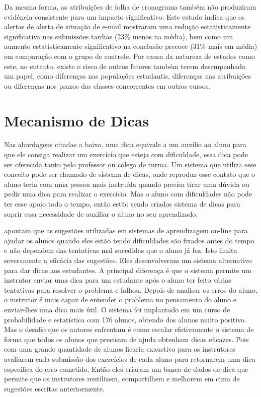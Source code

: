 Da mesma forma, as atribuições de folha de cronograma também não produziram evidência consistente para um impacto significativo. Este estudo indica que os alertas de alerta de situação de e-mail mostraram uma redução estatisticamente significativa nas submissões tardias (23\% menos na média), bem como um aumento estatisticamente significativo na conclusão precoce (31\% mais em média) em comparação com o grupo de controle. Por causa da natureza de estudos como este, no entanto, existe o risco de outros fatores também terem desempenhado um papel, como diferenças nas populações estudantis, diferenças nas atribuições ou diferenças nos prazos das classes concorrentes em outros cursos.

\section{Mecanismo de Dicas}

Nas abordagens citadas a baixo, uma dica equivale a um auxílio ao aluno para que ele consiga realizar um exercício que esteja com dificuldade, essa dica pode ser oferecida tanto pelo professor ou colega de turma. Um sistema que utiliza esse conceito pode ser chamado de sistema de dicas, onde reproduz esse contato que o aluno teria com uma pessoa mais instruída quando precisa tirar uma dúvida ou pedir uma dica para realizar o exercício. Mas o aluno com dificuldades não pode ter esse apoio todo o tempo, então estão sendo criados sistema de dicas para suprir essa necessidade de auxiliar o aluno no seu aprendizado.

 apontam que as sugestões utilizadas em sistemas de aprendizagem on-line para ajudar os alunos quando eles estão tendo dificuldades são fixados antes do tempo e não dependem das tentativas mal sucedidas que o aluno já fez. Isto limita severamente a eficácia das sugestões. Eles desenvolveram um sistema alternativo para dar dicas aos estudantes. A principal diferença é que o sistema permite um instrutor enviar uma dica para um estudante após o aluno ter feito várias tentativas para resolver o problema e falhou. Depois de analisar os erros do aluno, o instrutor é mais capaz de entender o problema no pensamento do aluno e enviar-lhes uma dica mais útil. O sistema foi implantado em um curso de probabilidade e estatística com 176 alunos, obtendo  dos alunos muito positivo. Mas o desafio que os autores enfrentam é como escalar efetivamente o sistema de forma que todos os alunos que precisam de ajuda obtenham dicas eficazes. Pois com uma grande quantidade de alunos ficaria exaustivo para os instrutores avaliarem cada submissão dos exercícios de cada aluno para retornarem uma dica especifica do erro cometido. Então eles criaram um banco de dados de dica que permite que os instrutores reutilizem, compartilhem e melhorem em cima de sugestões escritas anteriormente.

